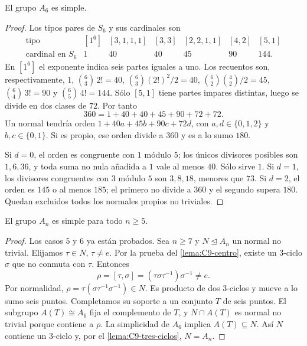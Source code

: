 \begin{lema}[Simplicidad de $A_6$]\label{lema:C9-A6}
El grupo $A_6$ es simple.
\end{lema}
\begin{proof}
Los tipos pares de $S_6$ y sus cardinales son
\[
\begin{array}{c|rrrrrr}
\text{tipo}&[1^6]&[3,1,1,1]&[3,3]&[2,2,1,1]&[4,2]&[5,1]\\\hline
\text{cardinal en }S_6&1&40&40&45&90&144.
\end{array}
\]
En $[1^6]$ el exponente indica seis partes iguales a uno. Los recuentos son, respectivamente, $1$, $\binom63\,2!=40$, $\binom63(2!)^2/2=40$, $\binom62\binom42/2=45$, $\binom64\,3!=90$ y $\binom65\,4!=144$. Sólo $[5,1]$ tiene partes impares distintas, luego se divide en dos clases de $72$. Por tanto
\[
360=1+40+40+45+90+72+72.
\]
Un normal tendría orden $1+40a+45b+90c+72d$, con $a,d\in\{0,1,2\}$ y $b,c\in\{0,1\}$. Si es propio, ese orden divide a $360$ y es a lo sumo $180$.

Si $d=0$, el orden es congruente con $1$ módulo $5$; los únicos divisores posibles son $1,6,36$, y toda suma no nula añadida a $1$ vale al menos $40$. Sólo sirve $1$. Si $d=1$, los divisores congruentes con $3$ módulo $5$ son $3,8,18$, menores que $73$. Si $d=2$, el orden es $145$ o al menos $185$; el primero no divide a $360$ y el segundo supera $180$. Quedan excluidos todos los normales propios no triviales.
\end{proof}

\begin{teo}\label{teo:C9-simple}
El grupo $A_n$ es simple para todo $n\ge5$.
\end{teo}
\begin{proof}
Los casos $5$ y $6$ ya están probados. Sea $n\ge7$ y $N\trianglelefteq A_n$ un normal no trivial. Elijamos $\tau\in N$, $\tau\ne e$. Por la prueba del \cref{lema:C9-centro}, existe un $3$-ciclo $\sigma$ que no conmuta con $\tau$. Entonces
\[
\rho=[\tau,\sigma]=(\tau\sigma\tau^{-1})\sigma^{-1}\ne e.
\]
Por normalidad, $\rho=\tau(\sigma\tau^{-1}\sigma^{-1})\in N$. Es producto de dos $3$-ciclos y mueve a lo sumo seis puntos. Completamos su soporte a un conjunto $T$ de seis puntos. El subgrupo $A(T)\cong A_6$ fija el complemento de $T$, y $N\cap A(T)$ es normal no trivial porque contiene a $\rho$. La simplicidad de $A_6$ implica $A(T)\subseteq N$. Así $N$ contiene un $3$-ciclo y, por el \cref{lema:C9-tres-ciclos}, $N=A_n$.
\end{proof}

